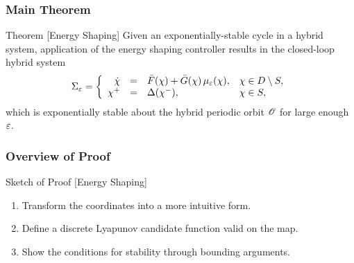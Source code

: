 \begin{frame}[t]
  \frametitle{Main Theorem}
  \begin{block}{Theorem [Energy Shaping]}
    Given an exponentially-stable cycle in a hybrid system, application
    of the energy shaping controller results in the closed-loop hybrid system
    \begin{align*}
      \Sigma_{\varepsilon} = \left\{
        \begin{array}{r c l l}
          {\dot {\chi}} &=& {\bar {F}}(\chi) + {\bar {G}}(\chi) \, \mu_{\varepsilon}(\chi), & \chi \in D \setminus S,\\
          \chi^{+} &=& \Delta(\chi^{-}), & \chi \in S,
        \end{array}\right.
    \end{align*}
    which is exponentially stable about the hybrid periodic orbit $\mathscr O$ for
    large enough $\varepsilon$.
  \end{block}
\end{frame}

\begin{frame}[t]
  \frametitle{Overview of Proof}
  \begin{block}{Sketch of Proof [Energy Shaping]}
    \begin{enumerate}
    \item Transform the coordinates into a more intuitive form.
    \item Define a discrete Lyapunov candidate function valid on the \Poincare{} map.
    \item Show the conditions for stability through bounding arguments.
    \end{enumerate}
  \end{block}
\end{frame}

